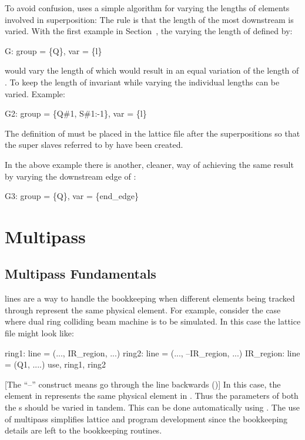 To avoid confusion, \bmad uses a simple algorithm for varying the lengths of elements involved in
superposition: The rule is that the length of the most downstream  is varied.  With
the first example in Section~, the   varying the length of 
defined by:
\begin{example}
  G: group = \{Q\}, var = \{l\}
\end{example}
would vary the length of  which would result in an equal variation of the length of
. To keep the length of  invariant while varying  the individual 
lengths can be varied. Example:
\begin{example}
  G2: group = \{Q{\#}1, S{\#}1:-1\}, var = \{l\}
\end{example}
The definition of  must be placed in the lattice file after the superpositions so that the
super slaves referred to by  have been created.

In the above example there is another, cleaner, way of achieving the same result by varying the
downstream edge of :
\begin{example}
  G3: group = \{Q\}, var = \{end_edge\}
\end{example}

\section{Multipass}
\label{s:multipass}

\subsection{Multipass Fundamentals}
\label{s:multipass.fund}

 lines are a way to handle the bookkeeping when different elements being tracked
through represent the same physical element. For example, consider the case where dual ring colliding
beam machine is to be simulated. In this case the lattice file might look like:
\begin{example}
  ring1: line = (..., IR_region, ...)
  ring2: line = (..., --IR_region, ...)
  IR_region: line = (Q1, ....)
  use, ring1, ring2
\end{example}
[The ``--'' construct means go through the line backwards ()] In this case, the
 element in  represents the same physical element in . Thus the parameters
of both the s should be varied in tandem. This can be done automatically using .
The use of multipass simplifies lattice and program development since the bookkeeping details are left
to the \bmad bookkeeping routines.

